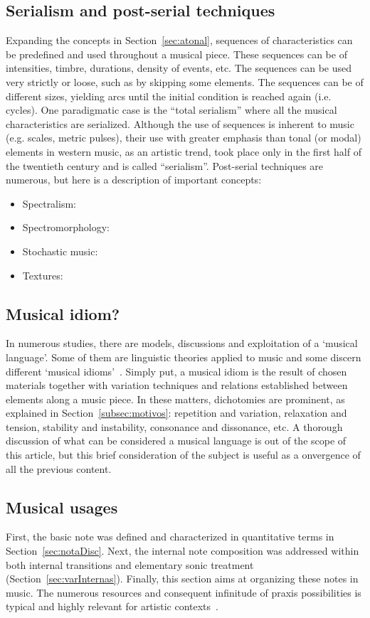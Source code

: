 \subsection{Serialism and post-serial techniques}
Expanding the concepts in Section~\ref{sec:atonal},
sequences of characteristics can be predefined and
used throughout a musical piece.
These sequences can be of intensities, timbre, durations,
density of events, etc.
The sequences can be used very strictly or loose,
such as by skipping some elements.
The sequences can be of different sizes, yielding arcs
until the initial condition is reached again (i.e. cycles).
One paradigmatic case is the ``total serialism'' where all
the musical characteristics are serialized.
Although the use of sequences is inherent to music (e.g. scales, metric pulses),
their use with greater emphasis than tonal (or modal) elements
in western music, as an artistic trend, took place only in the
first half of the twentieth century and is called ``serialism''.
Post-serial techniques are numerous, but here is a description of
important concepts:
\begin{itemize}
	\item Spectralism:
	\item Spectromorphology:
	\item Stochastic music:
	\item Textures:
\end{itemize}





\subsection{Musical idiom?}
In numerous studies, there are models, discussions and exploitation of a `musical language'.
Some of them are linguistic theories applied to music
and some discern different `musical
idioms'~\cite{Lerdahl, Harmonia, Salzer,Alfaix}. Simply put, a musical idiom
is the result of chosen materials together with variation techniques and
relations established between elements along a music piece. In these matters,
dichotomies are prominent, as explained in Section~\ref{subsec:motivos}:
repetition and variation, relaxation and tension, stability and instability, consonance and dissonance, etc.
A thorough discussion of what can be considered a musical language is out of the scope of this article, but this brief consideration of the subject is useful as a onvergence of all the previous content.

\subsection{Musical usages}\label{subsec:usosmusicais3}
First, the basic note was defined and characterized in quantitative terms in Section~\ref{sec:notaDisc}.
Next, the internal note
composition was addressed within both internal transitions and elementary sonic treatment
(Section~\ref{sec:varInternas}). Finally, this section aims at organizing these notes in music. The numerous resources and consequent infinitude
of praxis possibilities is typical and highly relevant for artistic contexts~\cite{Harmonia,Webern}.

